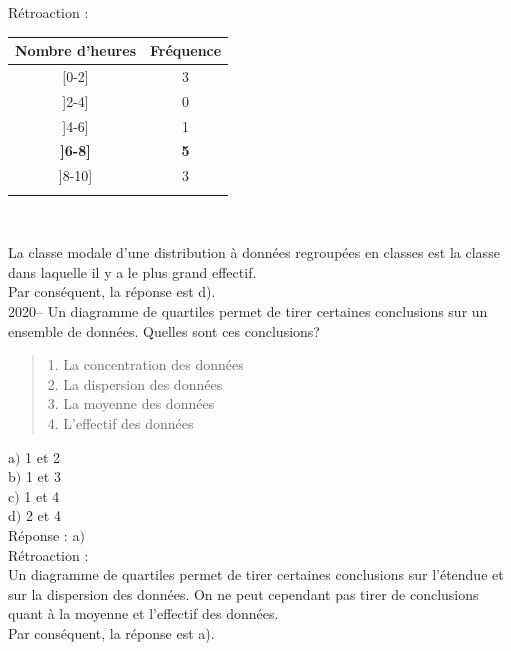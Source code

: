 \documentclass[letterpaper, 12pt]{article}
\begin{document}
R\'etroaction :\\
\begin{center}
 \begin{tabular}{|c|c|} \hline
{\bf Nombre d'heures} & {\bf Fr\'equence}  \\ \hline \hline

[0-2] & 3 \\ \hline
]2-4] & 0 \\ \hline
]4-6] & 1 \\ \hline
\textbf{]6-8]} & \textbf{5} \\ \hline
]8-10] & 3 \\ \hline
\multicolumn{2}{c}{}\\
\end{tabular}\\
\end{center}
La classe modale d'une distribution \`a donn\'ees regroup\'ees en classes est la classe dans laquelle il y a le plus grand effectif.\\
Par cons\'equent, la r\'eponse est d).\\


2020-- Un diagramme de quartiles permet de tirer certaines conclusions sur un ensemble de donn\'ees. Quelles sont ces conclusions? \\

\begin{quote}
1. La concentration des donn\'ees \\
2. La dispersion des donn\'ees\\
3. La moyenne des donn\'ees\\
4. L'effectif des donn\'ees\\
\end{quote}

a$)$ 1 et 2\\
b$)$ 1 et 3\\
c$)$ 1 et 4\\
d$)$ 2 et 4\\

R\'eponse : a$)$\\

R\'etroaction :\\
Un diagramme de quartiles permet de tirer certaines conclusions sur l'\'etendue et sur la dispersion des donn\'ees. On ne peut cependant pas tirer de conclusions quant \`a la moyenne et l'effectif des donn\'ees.\\
Par cons\'equent, la r\'eponse est a).\\
\end{document}
